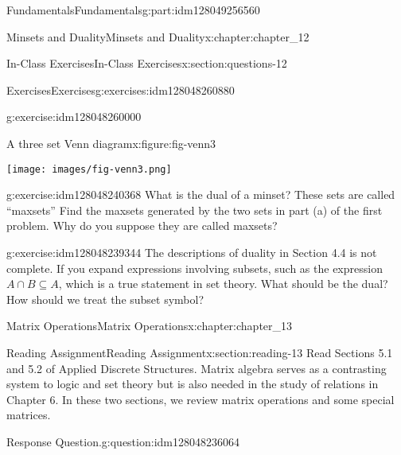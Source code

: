 \documentclass[oneside,10pt,]{book}
\numberwithin{equation}{section}
\begin{document}
\begin{partptx}{Fundamentals}{}{Fundamentals}{}{}{g:part:idm128049256560}
\begin{chapterptx}{Minsets and Duality}{}{Minsets and Duality}{}{}{x:chapter:chapter_12}
\begin{sectionptx}{In-Class Exercises}{}{In-Class Exercises}{}{}{x:section:questions-12}
\begin{exercises-subsection}{Exercises}{}{Exercises}{}{}{g:exercises:idm128048260880}
\begin{exercisegroup}
\begin{divisionexerciseeg}{2}{}{}{g:exercise:idm128048260000}
\begin{enumerate}[label=(\alph*)]
\end{enumerate}
%
\begin{figureptx}{A three set Venn diagram}{x:figure:fig-venn3}{}%
\begin{image}{0.05}{0.9}{0.05}%
\texttt{[image: images/fig-venn3.png]}
\end{image}%
\tcblower
\end{figureptx}%
\end{divisionexerciseeg}%
\begin{divisionexerciseeg}{3}{}{}{g:exercise:idm128048240368}%
What is the dual of a minset?  These sets are called ``maxsets''  Find the maxsets generated by the two sets in part (a) of the first problem.   Why do you suppose they are called maxsets?%
\end{divisionexerciseeg}%
\begin{divisionexerciseeg}{4}{}{}{g:exercise:idm128048239344}%
The descriptions of duality in Section 4.4 is not complete.  If you expand expressions involving subsets, such as the expression \(A \cap B \subseteq A\), which is a true statement in set theory.  What should be the dual?  How should we treat the subset symbol?%
\end{divisionexerciseeg}%
\end{exercisegroup}
\par\medskip\noindent
\end{exercises-subsection}
\end{sectionptx}
\end{chapterptx}
%
\typeout{************************************************}
\typeout{************************************************}
%
\begin{chapterptx}{Matrix Operations}{}{Matrix Operations}{}{}{x:chapter:chapter_13}
%
%
%
\typeout{************************************************}
\typeout{************************************************}
%
\begin{sectionptx}{Reading Assignment}{}{Reading Assignment}{}{}{x:section:reading-13}
Read Sections 5.1 and 5.2 of Applied Discrete Structures. Matrix algebra serves as a contrasting system to logic and set theory but is also needed in the study of relations in Chapter 6.  In these two sections, we review matrix operations and some special matrices.%
\begin{question}{Response Question.}{g:question:idm128048236064}%

\end{question}
\end{sectionptx}
\end{chapterptx}
\end{partptx}
\end{document}
